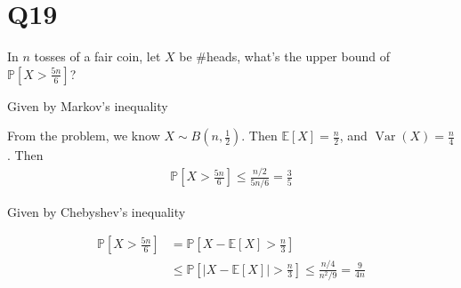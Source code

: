 \documentclass[11pt]{article}
\begin{document}
\section*{Q19}
In $n$ tosses of a fair coin, let $X$ be \#heads, what's the upper
bound of $\mathbb{P}\left[ X>\frac{5n}{6} \right] $?
\begin{qparts}
    
    \item Given by Markov's inequality
    \begin{solution}
        From the problem, we know $X \sim  B(n,\frac{1}{2})$. Then 
        $\mathbb{E}\left[ X \right]=\frac{n}{2} $, and $\operatorname{Var}(X)=\frac{n}{4}$. Then 
        \begin{align*}
            \mathbb{P}\left[ X>\frac{5n}{6} \right] \le \frac{n / 2}{5n / 6}=\frac{3}{5}
        \end{align*}
    \end{solution}

    \item Given by Chebyshev's inequality
    \begin{solution}
        \begin{align*}
            \mathbb{P}\left[ X>\frac{5n}{6} \right]&=\mathbb{P}\left[ X-\mathbb{E}\left[ X \right]>\frac{n}{3}  \right] \\
            &\le \mathbb{P}\left[ \left\vert X-\mathbb{E}\left[ X \right]  \right\vert >\frac{n}{3} \right] \le \frac{n / 4}{n^{2} / 9}=
            \frac{9}{4n}
        \end{align*}
    \end{solution}
\end{qparts}
\end{document}
